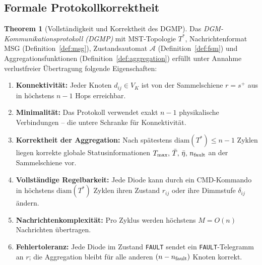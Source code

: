 ﻿\documentclass[a4paper,12pt]{article}
\theoremstyle{definition}
\newtheorem{theorem}[definition]{Theorem}
\theoremstyle{remark}
\begin{document}
\subsection{Formale Protokollkorrektheit}
\label{sec:komm_beweis}

\begin{theorem}[Vollständigkeit und Korrektheit des DGMP]
\label{thm:dgmp}
Das \emph{DGM-Kommunika\-tionsprotokoll (DGMP)} mit MST-Topologie $T^*$,
Nachrichtenformat MSG (Definition~\ref{def:msg}), Zustandsautomat
$\mathcal{A}$ (Definition~\ref{def:fsm}) und Aggregationsfunktionen
(Definition~\ref{def:aggregation}) erfüllt unter Annahme
verlustfreier Übertragung folgende Eigenschaften:
\begin{enumerate}[label=(P\arabic*)]
  \item \textbf{Konnektivität:} Jeder Knoten $d_{ij} \in V_K$ ist von der
    Sammelschiene $r = s^+$ aus in höchstens $n-1$ Hops erreichbar.
  \item \textbf{Minimalität:} Das Protokoll verwendet exakt $n-1$
    physikalische Verbindungen -- die untere Schranke für Konnektivität.
  \item \textbf{Korrektheit der Aggregation:} Nach spätestens
    $\mathrm{diam}(T^*) \leq n-1$ Zyklen liegen korrekte globale Statusinformationen
    $T_{\max},\, \bar{T},\, \bar{\eta},\, n_{\rm fault}$ an der Sammelschiene vor.
  \item \textbf{Vollständige Regelbarkeit:} Jede Diode kann durch ein
    CMD-Kommando in höchstens $\mathrm{diam}(T^*)$ Zyklen ihren Zustand
    $r_{ij}$ oder ihre Dimmstufe $\delta_{ij}$ ändern.
  \item \textbf{Nachrichtenkomplexität:} Pro Zyklus werden höchstens
    $M = O(n)$ Nachrichten übertragen.
  \item \textbf{Fehlertoleranz:} Jede Diode im Zustand \texttt{FAULT}
    sendet ein \texttt{FAULT}-Telegramm an $r$; die Aggregation bleibt
    für alle anderen $(n - n_{\rm fault})$ Knoten korrekt.
\end{enumerate}
\end{theorem}
\end{document}
